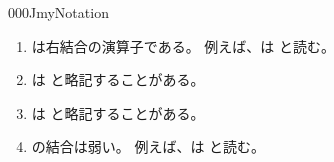\documentclass[index]{subfiles}
\begin{document}
\begin{myBlock}{000J}{myNotation}
  \begin{enumerate}
  \item \myInlineMath{\myFunType}は右結合の演算子である。
    例えば、は
    と読む。
  \item {}は
    と略記することがある。
  \item {}は
    と略記することがある。
  \item {}の結合は弱い。
    例えば、は
    と読む。
  \end{enumerate}
\end{myBlock}
\end{document}
